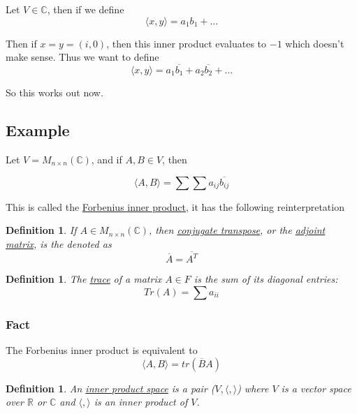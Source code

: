 \documentclass{article}
\newtheorem{definition}[theorem]{Definition}
\newtheorem{one minute paper}[theorem]{One Minute Paper}
\begin{document}
Let $V \in \mathbb{C}$, then if we define 
\begin{equation}
    \langle x,y \rangle = a_1b_1 + \dots 
\end{equation}

Then if $x =y = (i,0)$, then this inner product evaluates to $-1$ which doesn't make sense. Thus we want to define 
\begin{equation}
    \langle x,y \rangle = a_1\overline{b_1} + a_2\overline{b_2} + \dots
\end{equation}

So this works out now. 

\subsection*{Example}

Let $V = M_{n \times n}(\mathbb{C})$, and if $A, B \in V$, then 

\begin{equation}
    \langle A,B \rangle = \sum \sum a_{ij}\overline{b_{ij}}
\end{equation}

This is called the \underline{Forbenius inner product}, it has the following reinterpretation 
\begin{definition}
    If $A \in M_{n\times n}(\mathbb{C})$, then \underline{conjugate transpose}, or the \underline{adjoint matrix}, is the denoted as 
    \begin{equation}
        \overline{A} = \overline{A^T}
    \end{equation}
\end{definition}

\begin{definition}
    The \underline{trace} of a matrix $A \in F$ is the sum of its diagonal entries:
    \begin{equation}
        Tr(A) = \sum a_{ii}
    \end{equation}
\end{definition}

\subsubsection*{Fact}

The Forbenius inner product is equivalent to 
\begin{equation}
    \langle A,B \rangle = tr(\overline{B}A)
\end{equation}

\begin{definition}
    An \underline{inner product space} is a pair ($V, \langle, \rangle$) where $V$ is a vector space over 
    $\mathbb{R}$ or $\mathbb{C}$ and $\langle, \rangle$ is an inner product of $V$. 
\end{definition}
\end{document}

